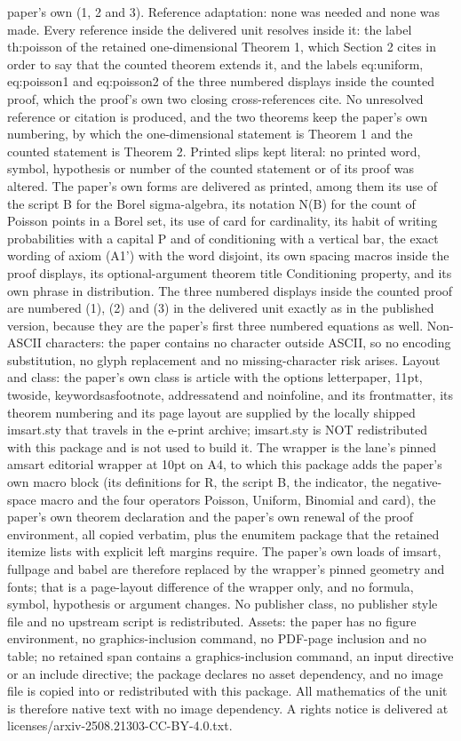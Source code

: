 \documentclass[10pt,a4paper]{amsart}
\begin{document}
paper's own (1, 2 and 3). Reference adaptation: none was needed and none was made. Every reference inside the delivered unit resolves inside it: the label th:poisson of the retained one-dimensional Theorem 1, which Section 2 cites in order to say that the counted theorem extends it, and the labels eq:uniform, eq:poisson1 and eq:poisson2 of the three numbered displays inside the counted proof, which the proof's own two closing cross-references cite. No unresolved reference or citation is produced, and the two theorems keep the paper's own numbering, by which the one-dimensional statement is Theorem 1 and the counted statement is Theorem 2. Printed slips kept literal: no printed word, symbol, hypothesis or number of the counted statement or of its proof was altered. The paper's own forms are delivered as printed, among them its use of the script B for the Borel sigma-algebra, its notation N(B) for the count of Poisson points in a Borel set, its use of card for cardinality, its habit of writing probabilities with a capital P and of conditioning with a vertical bar, the exact wording of axiom (A1') with the word disjoint, its own spacing macros inside the proof displays, its optional-argument theorem title Conditioning property, and its own phrase in distribution. The three numbered displays inside the counted proof are numbered (1), (2) and (3) in the delivered unit exactly as in the published version, because they are the paper's first three numbered equations as well. Non-ASCII characters: the paper contains no character outside ASCII, so no encoding substitution, no glyph replacement and no missing-character risk arises. Layout and class: the paper's own class is article with the options letterpaper, 11pt, twoside, keywordsasfootnote, addressatend and noinfoline, and its frontmatter, its theorem numbering and its page layout are supplied by the locally shipped imsart.sty that travels in the e-print archive; imsart.sty is NOT redistributed with this package and is not used to build it. The wrapper is the lane's pinned amsart editorial wrapper at 10pt on A4, to which this package adds the paper's own macro block (its definitions for R, the script B, the indicator, the negative-space macro and the four operators Poisson, Uniform, Binomial and card), the paper's own theorem declaration and the paper's own renewal of the proof environment, all copied verbatim, plus the enumitem package that the retained itemize lists with explicit left margins require. The paper's own loads of imsart, fullpage and babel are therefore replaced by the wrapper's pinned geometry and fonts; that is a page-layout difference of the wrapper only, and no formula, symbol, hypothesis or argument changes. No publisher class, no publisher style file and no upstream script is redistributed. Assets: the paper has no figure environment, no graphics-inclusion command, no PDF-page inclusion and no table; no retained span contains a graphics-inclusion command, an input directive or an include directive; the package declares no asset dependency, and no image file is copied into or redistributed with this package. All mathematics of the unit is therefore native text with no image dependency. A rights notice is delivered at licenses/arxiv-2508.21303-CC-BY-4.0.txt.
\end{document}
